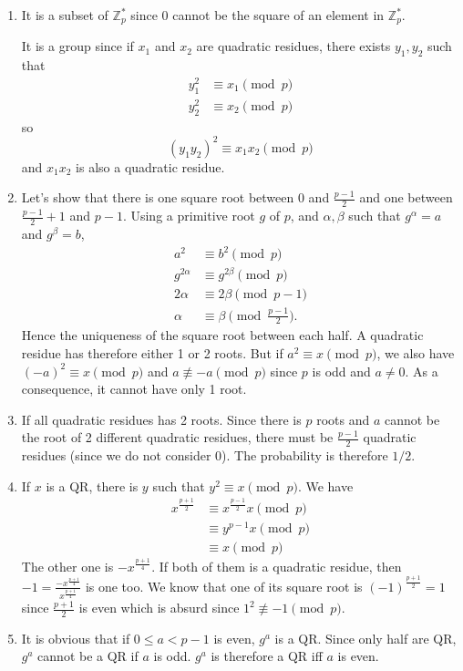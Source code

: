 \begin{solution}
  \begin{enumerate}
    \item
      It is a subset of $\mathbb{Z}_p^*$ since $0$
      cannot be the square of an element in $\mathbb{Z}_p^*$.

      It is a group since if $x_1$ and $x_2$ are quadratic residues,
      there exists $y_1,y_2$ such that
      \begin{align*}
        y_1^2 & \equiv x_1 \pmod{p}\\
        y_2^2 & \equiv x_2 \pmod{p}
      \end{align*}
      so
      \[ (y_1y_2)^2 \equiv x_1x_2 \pmod{p} \]
      and $x_1x_2$ is also a quadratic residue.
    \item
      Let's show that there is one square root between $0$ and $\frac{p-1}{2}$ and one between $\frac{p-1}{2}+1$ and $p-1$.
      Using a primitive root $g$ of $p$, and $\alpha,\beta$ such that $g^\alpha = a$ and $g^\beta = b$,
      \begin{align*}
        a^2 & \equiv b^2 \pmod{p}\\
        g^{2\alpha} & \equiv g^{2\beta} \pmod{p}\\
        2\alpha & \equiv 2\beta \pmod{p-1}\\
        \alpha & \equiv \beta \pmod{\frac{p-1}{2}}.
      \end{align*}
      Hence the uniqueness of the square root between each half.
      A quadratic residue has therefore either 1 or 2 roots.
      But if $a^2 \equiv x \pmod{p}$, we also have $(-a)^2 \equiv x \pmod{p}$ and $a \not\equiv -a \pmod{p}$ since $p$ is odd and $a \neq 0$.
      As a consequence, it cannot have only 1 root.
    \item
      If all quadratic residues has 2 roots.
      Since there is $p$ roots and $a$ cannot be the root of 2 different quadratic residues,
      there must be $\frac{p-1}{2}$ quadratic residues (since we do not consider 0).
      The probability is therefore $1/2$.
    \item
      If $x$ is a QR, there is $y$ such that $y^2 \equiv x \pmod{p}$.
      We have
      \begin{align*}
        x^{\frac{p+1}{2}}
        & \equiv x^{\frac{p-1}{2}}x \pmod{p}\\
        & \equiv y^{p-1}x \pmod{p}\\
        & \equiv x \pmod{p}
      \end{align*}
      The other one is $-x^{\frac{p+1}{4}}$.
      If both of them is a quadratic residue, then $-1 = \frac{-x^{\frac{p+1}{4}}}{x^{\frac{p+1}{4}}}$ is one too.
      We know that one of its square root is $(-1)^{\frac{p+1}{2}} = 1$ since $\frac{p+1}{2}$ is even which is absurd
      since $1^2 \not\equiv -1 \pmod{p}$.
    \item
      It is obvious that if $0 \leq a < p-1$ is even, $g^a$ is a QR.
      Since only half are QR, $g^a$ cannot be a QR if $a$ is odd.
      $g^a$ is therefore a QR iff $a$ is even.


\end{enumerate}
\end{solution}
